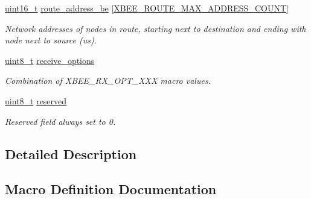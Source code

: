 \begin{DoxyCompactItemize}
\hyperlink{group__hal__dos_ga5a8b2dc9e45a9ee81a94ef304fb62505}{uint16\+\_\+t} \hyperlink{group__xbee__route_ga943070c7e317d394725c1e65ef4efd04}{route\+\_\+address\+\_\+be} \mbox{[}\hyperlink{group__xbee__route_ga41b7c2f8ef5f6e4912572871790611d2}{X\+B\+E\+E\+\_\+\+R\+O\+U\+T\+E\+\_\+\+M\+A\+X\+\_\+\+A\+D\+D\+R\+E\+S\+S\+\_\+\+C\+O\+U\+NT}\mbox{]}
\begin{DoxyCompactList}\small\item\em Network addresses of nodes in route, starting next to destination and ending with node next to source (us). \end{DoxyCompactList}\item 
\mbox{\label{group__xbee__route_gabf2f34f6b8fa4870cb757aa844335a4f}} 
\hyperlink{group__hal__dos_gae1affc9ca37cfb624959c866a73f83c2}{uint8\+\_\+t} \hyperlink{group__xbee__route_gabf2f34f6b8fa4870cb757aa844335a4f}{receive\+\_\+options}
\begin{DoxyCompactList}\small\item\em Combination of X\+B\+E\+E\+\_\+\+R\+X\+\_\+\+O\+P\+T\+\_\+\+X\+XX macro values. \end{DoxyCompactList}\item 
\mbox{\label{group__xbee__route_gacb7bc06bed6f6408d719334fc41698c7}} 
\hyperlink{group__hal__dos_gae1affc9ca37cfb624959c866a73f83c2}{uint8\+\_\+t} \hyperlink{group__xbee__route_gacb7bc06bed6f6408d719334fc41698c7}{reserved}
\begin{DoxyCompactList}\small\item\em Reserved field always set to 0. \end{DoxyCompactList}\end{DoxyCompactItemize}


\subsection{Detailed Description}


\subsection{Macro Definition Documentation}
\mbox{\label{group__xbee__route_gab9293f39692e0bc50896eed12ef89d4e}} 

